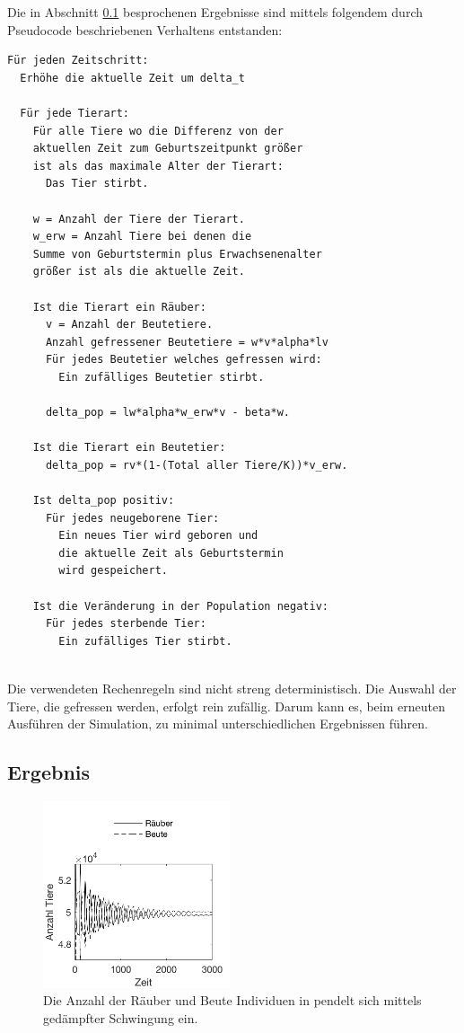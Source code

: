 \documentclass[a4paper,twoside]{article}
\begin{document}
	Die in Abschnitt \ref{sec:Ergebnis_Agent_Model} besprochenen Ergebnisse sind mittels folgendem durch Pseudocode beschriebenen Verhaltens entstanden:
	
	\begin{small}
	\begin{verbatim}
Für jeden Zeitschritt:
  Erhöhe die aktuelle Zeit um delta_t

  Für jede Tierart:
    Für alle Tiere wo die Differenz von der 
    aktuellen Zeit zum Geburtszeitpunkt größer
    ist als das maximale Alter der Tierart:
      Das Tier stirbt.

    w = Anzahl der Tiere der Tierart.
    w_erw = Anzahl Tiere bei denen die 
    Summe von Geburtstermin plus Erwachsenenalter 
    größer ist als die aktuelle Zeit.

    Ist die Tierart ein Räuber:
      v = Anzahl der Beutetiere.
      Anzahl gefressener Beutetiere = w*v*alpha*lv
      Für jedes Beutetier welches gefressen wird:
        Ein zufälliges Beutetier stirbt.
            
      delta_pop = lw*alpha*w_erw*v - beta*w.

    Ist die Tierart ein Beutetier:
      delta_pop = rv*(1-(Total aller Tiere/K))*v_erw.

    Ist delta_pop positiv:
      Für jedes neugeborene Tier:
        Ein neues Tier wird geboren und 
        die aktuelle Zeit als Geburtstermin 
        wird gespeichert.

    Ist die Veränderung in der Population negativ:
      Für jedes sterbende Tier:
        Ein zufälliges Tier stirbt.	
 		
	\end{verbatim}
	\end{small}
	
	Die verwendeten Rechenregeln sind nicht streng deterministisch. Die Auswahl der Tiere, die gefressen werden, erfolgt rein zufällig. Darum kann es, beim erneuten Ausführen der Simulation, zu minimal unterschiedlichen Ergebnissen führen.
	
	\subsection{Ergebnis}\label{sec:Ergebnis_Agent_Model}
	
	\begin{figure}[!h]
  		\centering
 		\includegraphics[width=5.5cm]{Diagramme/agent_model_damped.png}
  		\caption{Die Anzahl der Räuber und Beute Individuen in pendelt sich mittels gedämpfter Schwingung ein.}
  		\label{fig:agent_model_damped}
	\end{figure}
	
\end{document}

